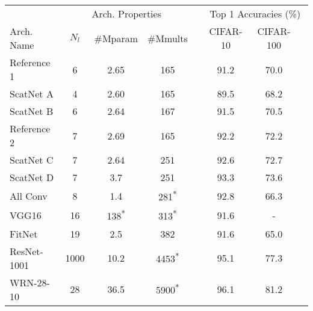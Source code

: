 \begin{table}
  \renewcommand{\arraystretch}{1.2}
  \centering
  \label{tab:ch5:hybrid_scat}
  \begin{tabular}{@{}lccccccc@{}}
    \toprule
    & \multicolumn{3}{c}{Arch. Properties} && \multicolumn{3}{c}{Top 1 Accuracies (\%)} \\\cline{2-4}\cline{6-7}
    Arch. Name \phantom{abcde} & $N_l$ &\#Mparam &\#Mmults&\phantom{ab}&CIFAR-10&CIFAR-100\\ \midrule
    Reference 1 & 6 & 2.65 & 165 && 91.2 & 70.0 \\ 
    ScatNet A & 4 & 2.60 & 165 && 89.5 & 68.2 \\ 
    ScatNet B & 6 & 2.64 & 167 && 91.5 & 70.5  \\\midrule %
    Reference 2 & 7 & 2.69 & 165 && 92.2 & 72.2  \\ 
    ScatNet C & 7 & 2.64 & 251 && 92.6 & 72.7  \\ 
    ScatNet D & 7 & 3.7 & 251 && 93.3 & 73.6 \\ \midrule 
    All Conv\cite{springenberg_striving_2014-3} & 8 & 1.4 & 281\textsuperscript{*} && 92.8 & 66.3 \\ %
    VGG16\cite{liu_very_2015} & 16 & 138\textsuperscript{*} & 313\textsuperscript{*}  && 91.6 & -  \\ 
    FitNet\cite{romero_fitnets:_2014} & 19 & 2.5 & 382 && 91.6 & 65.0 \\ %
    ResNet-1001\cite{he_identity_2016} & 1000 & 10.2 & 4453\textsuperscript{*}&& 95.1 & 77.3 \\ %
    WRN-28-10\cite{zagoruyko_wide_2016} & 28 & 36.5 & 5900\textsuperscript{*} && 96.1 & 81.2 \\ %

\end{tabular}
\end{table}
